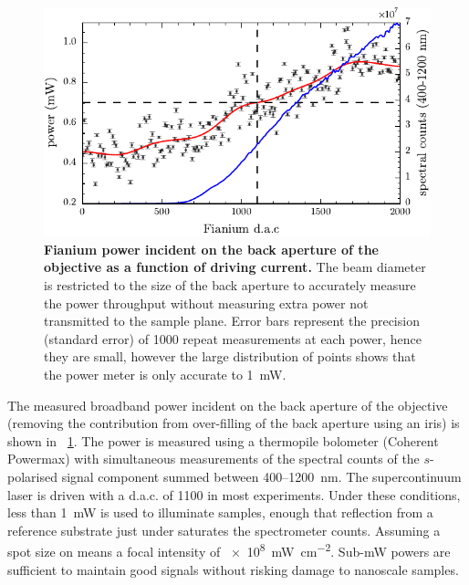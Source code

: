 \documentclass[12pt, a4paper, twoside]{book}
\begin{document}
\begin{figure}[bt]
\centering
\includegraphics{figures/fianium_power}
\caption*
{\textbf{Fianium power incident on the back aperture of the objective as a function of driving current.} The beam diameter is restricted to the size of the back aperture to accurately measure the power throughput without measuring extra power not transmitted to the sample plane. Error bars represent the precision (standard error) of 1000 repeat measurements at each power, hence they are small, however the large distribution of points shows that the power meter is only accurate to \SI{1}{mW}.}
\label{fig:fianium_power}
\end{figure}

The measured broadband power incident on the back aperture of the objective (removing the contribution from over-filling of the back aperture using an iris) is shown in \figurename~\ref{fig:fianium_power}. The power is measured using a thermopile bolometer (Coherent Powermax) with simultaneous measurements of the spectral counts of the $s$-polarised signal component summed between 400--\SI{1200}{nm}. The supercontinuum laser is driven with a d.a.c. of 1100 in most experiments. Under these conditions, less than \SI{1}{mW} is used to illuminate samples, enough that reflection from a reference substrate just under saturates the spectrometer counts. Assuming a spot size on  means a focal intensity of \SI{e8}{\milli\watt\per\centi\metre\squared}. Sub-mW powers are sufficient to maintain good signals without risking damage to nanoscale samples.
\end{document}
